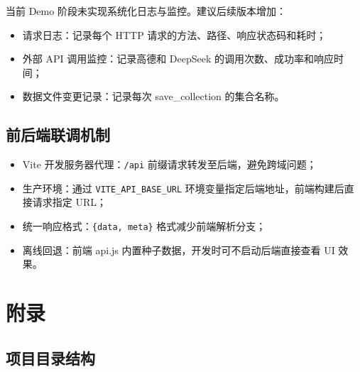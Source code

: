 \documentclass[12pt,a4paper]{ctexart}
\begin{document}
当前 Demo 阶段未实现系统化日志与监控。建议后续版本增加：
\begin{itemize}
  \item 请求日志：记录每个 HTTP 请求的方法、路径、响应状态码和耗时；
  \item 外部 API 调用监控：记录高德和 DeepSeek 的调用次数、成功率和响应时间；
  \item 数据文件变更记录：记录每次 save\_collection 的集合名称。
\end{itemize}

\subsection{前后端联调机制}

\begin{itemize}
  \item Vite 开发服务器代理：\texttt{/api} 前缀请求转发至后端，避免跨域问题；
  \item 生产环境：通过 \texttt{VITE\_API\_BASE\_URL} 环境变量指定后端地址，前端构建后直接请求指定 URL；
  \item 统一响应格式：\texttt{\{data, meta\}} 格式减少前端解析分支；
  \item 离线回退：前端 api.js 内置种子数据，开发时可不启动后端直接查看 UI 效果。
\end{itemize}

\newpage

\appendix
\section{附录}

\subsection{项目目录结构}
\end{document}
